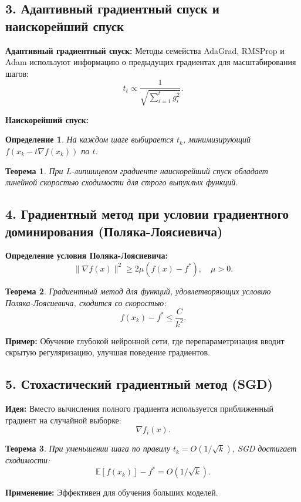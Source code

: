 \documentclass[a4paper,12pt]{article}
\newtheorem{theorem}{Теорема}
\newtheorem{definition}{Определение}
\begin{document}
\subsection*{3. Адаптивный градиентный спуск и наискорейший спуск}
\textbf{Адаптивный градиентный спуск:}
Методы семейства AdaGrad, RMSProp и Adam используют информацию о предыдущих градиентах для масштабирования шагов:
\[
t_t \propto \frac{1}{\sqrt{\sum_{i=1}^t g_i^2}}.
\]

\textbf{Наискорейший спуск:}
\begin{definition}
На каждом шаге выбирается \(t_k\), минимизирующий \(f(x_k - t \nabla f(x_k))\) по \(t\).
\end{definition}

\begin{theorem}
При \(L\)-липшицевом градиенте наискорейший спуск обладает линейной скоростью сходимости для строго выпуклых функций.
\end{theorem}

\subsection*{4. Градиентный метод при условии градиентного доминирования (Поляка-Лоясиевича)}
\textbf{Определение условия Поляка-Лоясиевича:}
\[
\|\nabla f(x)\|^2 \geq 2\mu (f(x) - f^*), \quad \mu > 0.
\]

\begin{theorem}
Градиентный метод для функций, удовлетворяющих условию Поляка-Лоясиевича, сходится со скоростью:
\[
f(x_k) - f^* \leq \frac{C}{k^2}.
\]
\end{theorem}

\textbf{Пример:} Обучение глубокой нейронной сети, где перепараметризация вводит скрытую регуляризацию, улучшая поведение градиентов.

\subsection*{5. Стохастический градиентный метод (SGD)}
\textbf{Идея:} Вместо вычисления полного градиента используется приближенный градиент на случайной выборке:
\[
\nabla f_i(x).
\]

\begin{theorem}
При уменьшении шага по правилу \(t_k = O(1/\sqrt{k})\), SGD достигает сходимости:
\[
\mathbb{E}[f(x_k)] - f^* = O(1/\sqrt{k}).
\]
\end{theorem}

\textbf{Применение:} Эффективен для обучения больших моделей.
\end{document}

